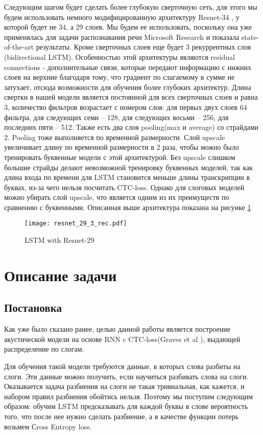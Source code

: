 \documentclass[a4paper,14pt]{extarticle}
\begin{document}
Следующим шагом будет сделать более глубокую сверточную сеть, для этого мы будем использовать немного модифицированную архитектуру Resnet-34 \cite{resnet}, у которой будет не 34, а 29 слоев. Мы будем ее использовать, поскольку она уже применялась для задачи распознавания речи Microsoft Research и показала state-of-the-art результаты. Кроме сверточных слоев еще будет 3 рекуррентных слоя (bidirectional LSTM). Особенностью этой архитектуры являются residual connections - дополнительные связи, которые передают информацию с нижних слоев на верхние благодаря тому, что градиент по слагаемому в сумме не затухает, отсюда возможности для обучения более глубоких архитектур. Длина свертки в нашей модели является постоянной для всех сверточных слоев и равна 3, количество фильтров возрастает с номером слоя: для первых двух слоев 64 фильтра, для следующих семи -- 128, для следующих восьми -- 256, для последних пяти -- 512. Также есть два слоя pooling(max и average) со страйдами 2. Pooling тоже выполняется по временной размерности. Слой upscale увеличивает длину по временной размерности в 2 раза, чтобы можно было тренировать буквенные модели с этой архитектурой. Без upscale слишком большие страйды делают невозможной тренировку буквенных моделей, так как длина входа по времени для LSTM становится меньше длины транскрипции в буквах, из-за чего нельзя посчитать CTC-loss. Однако для слоговых моделей можно убирать слой upscale, что является одним из их преимуществ по сравнению с буквенными. Описанная выше архитектура показана на рисунке \ref{resnet29}
\begin{figure}[!h]
	\centering
	\texttt{[image: resnet\_29\_3\_rec.pdf]}%
	\caption{LSTM with Resnet-29}
	\label{resnet29}
\end{figure}
\pagebreak
\section{Описание задачи}
\subsection{Постановка}
Как уже было сказано ранее, целью данной работы является построение акустической модели на основе RNN c CTC-loss(Graves et al \cite{graves2014towards}), выдающей распределение по слогам. 

Для обучения такой модели требуются данные, в которых слова разбиты на слоги. Эти данные можно получить, если научиться разбивать слова на слоги. Оказывается задача разбиения на слоги не такая тривиальная, как кажется, и набором правил разбиения обойтись нельзя. Поэтому мы поступим следующим образом: обучим LSTM предсказывать для каждой буквы в слове вероятность того, что после нее нужно сделать разбиение, а в качестве функции потерь возьмем Сross Entropy loss. 
\end{document}
